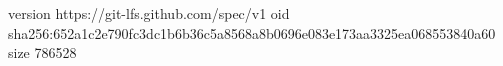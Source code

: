 version https://git-lfs.github.com/spec/v1
oid sha256:652a1c2e790fc3dc1b6b36c5a8568a8b0696e083e173aa3325ea068553840a60
size 786528
